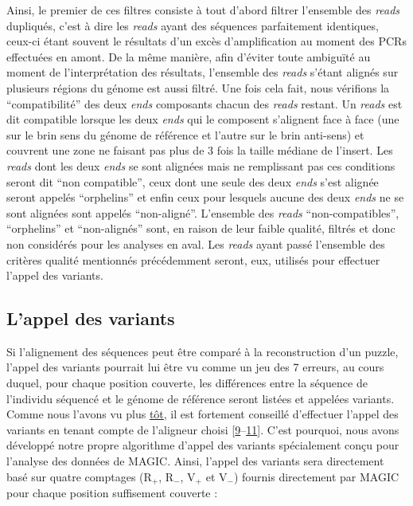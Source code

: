 \documentclass[12pt,twoside]{ugathesis}
\begin{document}
Ainsi, le premier de ces filtres consiste à tout d'abord filtrer
l'ensemble des \emph{reads} dupliqués, c'est à dire les \emph{reads}
ayant des séquences parfaitement identiques, ceux-ci étant souvent le
résultats d'un excès d'amplification au moment des PCRs effectuées en
amont. De la même manière, afin d'éviter toute ambiguïté au moment de
l'interprétation des résultats, l'ensemble des \emph{reads} s'étant
alignés sur plusieurs régions du génome est aussi filtré. Une fois cela
fait, nous vérifions la ``compatibilité'' des deux \emph{ends}
composants chacun des \emph{reads} restant. Un \emph{reads} est dit
compatible lorsque les deux \emph{ends} qui le composent s'alignent face
à face (une sur le brin sens du génome de référence et l'autre sur le
brin anti-sens) et couvrent une zone ne faisant pas plus de 3 fois la
taille médiane de l'insert. Les \emph{reads} dont les deux \emph{ends}
se sont alignées mais ne remplissant pas ces conditions seront dit ``non
compatible'', ceux dont une seule des deux \emph{ends} s'est alignée
seront appelés ``orphelins'' et enfin ceux pour lesquels aucune des deux
\emph{ends} ne se sont alignées sont appelés ``non-aligné''. L'ensemble
des \emph{reads} ``non-compatibles'', ``orphelins'' et ``non-alignés''
sont, en raison de leur faible qualité, filtrés et donc non considérés
pour les analyses en aval. Les \emph{reads} ayant passé l'ensemble des
critères qualité mentionnés précédemment seront, eux, utilisés pour
effectuer l'appel des variants.

\newpage

\subsection{L'appel des variants}\label{lappel-des-variants}

Si l'alignement des séquences peut être comparé à la reconstruction d'un
puzzle, l'appel des variants pourrait lui être vu comme un jeu des 7
erreurs, au cours duquel, pour chaque position couverte, les différences
entre la séquence de l'individu séquencé et le génome de référence
seront listées et appelées variants. Comme nous l'avons vu plus
\protect\hyperlink{varcall}{tôt}, il est fortement conseillé d'effectuer
l'appel des variants en tenant compte de l'aligneur choisi
{[}\protect\hyperlink{ref-Nielsen2011}{9}--\protect\hyperlink{ref-Lunter2011}{11}{]}.
C'est pourquoi, nous avons développé notre propre algorithme d'appel des
variants spécialement conçu pour l'analyse des données de MAGIC. Ainsi,
l'appel des variants sera directement basé sur quatre comptages
(R\(_+\), R\(_-\), V\(_+\) et V\(_-\)) fournis directement par MAGIC
pour chaque position suffisement couverte :
\end{document}

